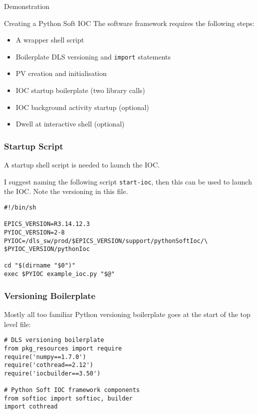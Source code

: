 \documentclass{beamer}
\begin{document}
%
\begin{frame}{Demonstration}
\end{frame}


%
\begin{frame}{Creating a Python Soft IOC}
The software framework requires the following steps:

\begin{itemize}
\item A wrapper shell script
\item Boilerplate DLS versioning and \texttt{import} statements
\item PV creation and initialisation
\item IOC startup boilerplate (two library calls)
\item IOC background activity startup (optional)
\item Dwell at interactive shell (optional)
\end{itemize}

\end{frame}


%
\begin{frame}[fragile]\frametitle{Startup Script}

A startup shell script is needed to launch the IOC.

\medskip

I suggest naming the following script \texttt{start-ioc}, then this can be used
to launch the IOC.  Note the versioning in this file.

\lstset{language=bash}
\begin{lstlisting}
#!/bin/sh

EPICS_VERSION=R3.14.12.3
PYIOC_VERSION=2-8
PYIOC=/dls_sw/prod/$EPICS_VERSION/support/pythonSoftIoc/\
$PYIOC_VERSION/pythonIoc

cd "$(dirname "$0")"
exec $PYIOC example_ioc.py "$@"
\end{lstlisting}

\end{frame}


%
\begin{frame}[fragile]\frametitle{Versioning Boilerplate}

Mostly all too familiar Python versioning boilerplate goes at the start of the
top level file:

\lstset{language=Python}
\begin{lstlisting}
# DLS versioning boilerplate
from pkg_resources import require
require('numpy==1.7.0')
require('cothread==2.12')
require('iocbuilder==3.50')

# Python Soft IOC framework components
from softioc import softioc, builder
import cothread
\end{lstlisting}

\end{frame}
\end{document}
